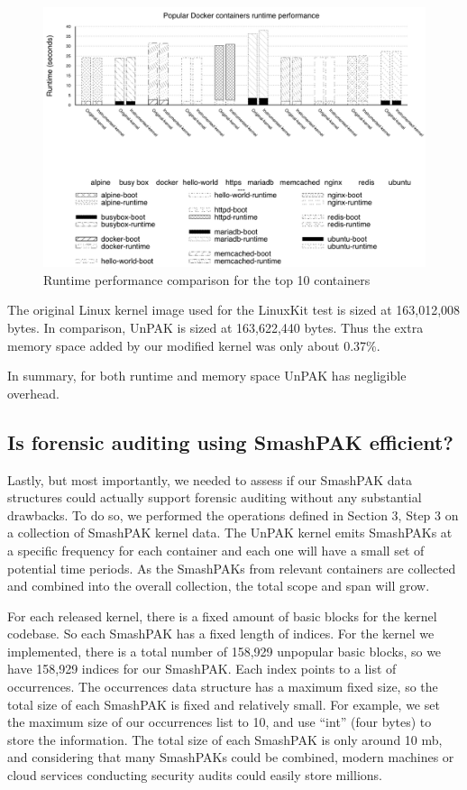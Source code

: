 \begin{figure}
\includegraphics[width=1.0\columnwidth]{diagram/performance.png}
\caption{\small Runtime performance comparison for the top 10 containers}
\label{fig:performance}
\end{figure}

The original Linux kernel image used for the LinuxKit test  is sized at 163,012,008 bytes. In comparison, UnPAK is sized at 163,622,440 bytes. 
Thus the extra memory space added by our modified kernel was only about 0.37\%. 

In summary, for both runtime and memory space UnPAK has negligible overhead.

\subsection{Is forensic auditing using SmashPAK efficient?}
\label{sec.evaluation.5} 
Lastly, but most importantly, we needed to assess if our SmashPAK data structures could actually support  forensic auditing without any substantial drawbacks. 
To do so, we performed the  operations defined in Section 3, Step 3 on a collection of SmashPAK kernel data. 
The UnPAK kernel emits SmashPAKs at a specific frequency for each container and each one will have a small set of potential time periods.  
As the SmashPAKs from relevant containers are collected and combined into the overall collection, the total scope and span will grow. 

For each released kernel, there is a fixed amount of basic blocks for the kernel codebase. So each SmashPAK has a fixed length of indices. 
For the kernel we implemented, there is a total number of 158,929 unpopular basic blocks, so we have 158,929 indices for our SmashPAK. 
Each index points to a list of occurrences. The occurrences data structure has a maximum fixed size, so the total size of each SmashPAK is fixed and relatively small. 
For example, we set the maximum size of our occurrences list to 10, and use ``int'' (four bytes) to store the information. 
The total size of each SmashPAK is only around 10 mb, and considering that many SmashPAKs could be combined, 
modern machines or cloud services conducting security audits could easily store millions. 

